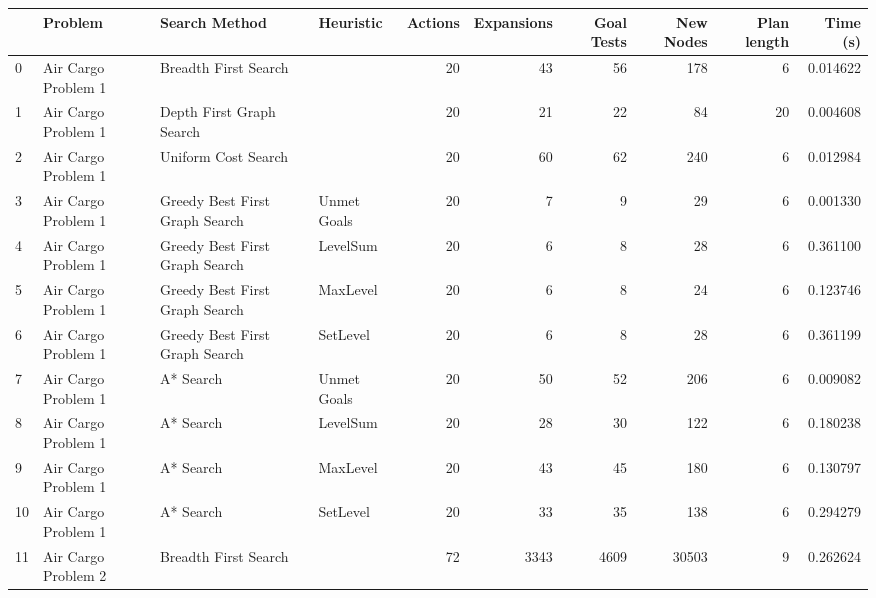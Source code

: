 \begin{tabular}{llllrrrrrr}
\toprule
{} &              Problem &                   Search Method &    Heuristic &  Actions &  Expansions &  Goal Tests &  New Nodes &  Plan length &     Time (s) \\
\midrule
0  &  Air Cargo Problem 1 &            Breadth First Search &              &       20 &          43 &          56 &        178 &            6 &     0.014622 \\
1  &  Air Cargo Problem 1 &        Depth First Graph Search &              &       20 &          21 &          22 &         84 &           20 &     0.004608 \\
2  &  Air Cargo Problem 1 &             Uniform Cost Search &              &       20 &          60 &          62 &        240 &            6 &     0.012984 \\
3  &  Air Cargo Problem 1 &  Greedy Best First Graph Search &  Unmet Goals &       20 &           7 &           9 &         29 &            6 &     0.001330 \\
4  &  Air Cargo Problem 1 &  Greedy Best First Graph Search &     LevelSum &       20 &           6 &           8 &         28 &            6 &     0.361100 \\
5  &  Air Cargo Problem 1 &  Greedy Best First Graph Search &     MaxLevel &       20 &           6 &           8 &         24 &            6 &     0.123746 \\
6  &  Air Cargo Problem 1 &  Greedy Best First Graph Search &     SetLevel &       20 &           6 &           8 &         28 &            6 &     0.361199 \\
7  &  Air Cargo Problem 1 &                       A* Search &  Unmet Goals &       20 &          50 &          52 &        206 &            6 &     0.009082 \\
8  &  Air Cargo Problem 1 &                       A* Search &     LevelSum &       20 &          28 &          30 &        122 &            6 &     0.180238 \\
9  &  Air Cargo Problem 1 &                       A* Search &     MaxLevel &       20 &          43 &          45 &        180 &            6 &     0.130797 \\
10 &  Air Cargo Problem 1 &                       A* Search &     SetLevel &       20 &          33 &          35 &        138 &            6 &     0.294279 \\
11 &  Air Cargo Problem 2 &            Breadth First Search &              &       72 &        3343 &        4609 &      30503 &            9 &     0.262624 \\

\end{tabular}
